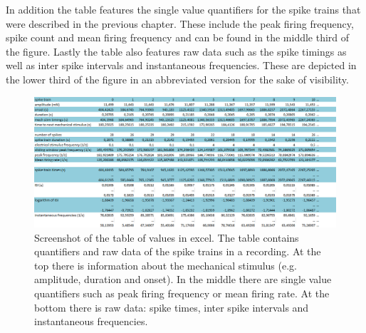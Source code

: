 In addition the table features the single value quantifiers for the spike trains that were described in the previous chapter. These include the peak firing frequency, spike count and mean firing frequency and can be found in the middle third of the figure.
Lastly the table also features raw data such as the spike timings as well as inter spike intervals and instantaneous frequencies. These are depicted in the lower third of the figure in an abbreviated version for the sake of visibility.
\begin{figure}
	\includegraphics[width = \textwidth]{src/pic/11_12_13_screenshot_for_overview}
	\caption{Screenshot of the table of values in excel. The table contains quantifiers and raw data of the spike trains in a recording. At the top there is information about the mechanical stimulus (e.g. amplitude, duration and onset). In the middle there are single value quantifiers such as peak firing frequency or mean firing rate. At the bottom there is raw data: spike times, inter spike intervals and instantaneous frequencies.}
	\label{fig:table_sc}
\end{figure}

